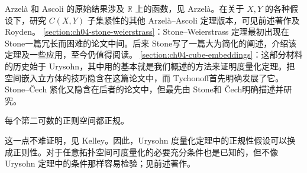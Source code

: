 \documentclass[../../main.tex]{subfiles}
\begin{document}
Arzelà 和 Ascoli 的原始结果涉及 $\mathbb R$ 上的函数，见 Arzelà\cite{folland-bib-006}。在关于 $X,Y$ 的各种假设下，研究 $C(X,Y)$ 子集紧性的其他 Arzelà--Ascoli 定理版本，可见前述著作及 Royden\cite{folland-bib-121}。
\cref{section:ch04-stone-weierstrass}：Stone--Weierstrass 定理最初出现在 Stone\cite{folland-bib-144}一篇冗长而困难的论文中间。后来 Stone\cite{folland-bib-145}写了一篇大为简化的阐述，介绍该定理及一些应用，至今仍值得阅读。
\cref{section:ch04-cube-embeddings}：这部分材料的历史始于 Urysohn\cite{folland-bib-153}，其中用的基本就是我们概述的方法来证明度量化定理。把空间嵌入立方体的技巧隐含在这篇论文中，而 Tychonoff\cite{folland-bib-151}首先明确发展了它。Stone--Čech 紧化又隐含在后者的论文中，但最先由 Stone\cite{folland-bib-144}和 Čech\cite{folland-bib-023}明确描述并研究。
\begin{proposition}\label{proposition:ch04-second-countable-regular-normal}
每个第二可数的正则空间都正规。
\end{proposition}
这一点不难证明，见 Kelley\cite[Lemma 4.1]{folland-bib-082}。因此，Urysohn 度量化定理中的正规性假设可以换成正则性。对于任意拓扑空间可度量化的必要充分条件也是已知的，但不像 Urysohn 定理中的条件那样容易检验；见前述著作。
\end{document}
